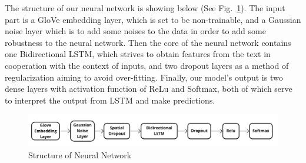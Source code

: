 \documentclass[11pt,a4paper,man,floatsintext]{apa6}
\begin{document}


The structure of our neural network is showing below (See Fig.~\ref{struct}). The input part is a GloVe embedding layer, which is set to be non-trainable, and a Gaussian noise layer which is to add some noises to the data in order to add some robustness to the neural network. Then the core of the neural network contains one Bidirectional LSTM, which strives to obtain features from the text in cooperation with the context of inputs, and two dropout layers as a method of regularization aiming to avoid over-fitting. Finally, our model's output is two dense layers with activation function of ReLu and Softmax, both of which serve to interpret the output from LSTM and make predictions.

\begin{figure}[H]
\centering
\includegraphics[width=6in]{img/NeuralNetworkStructure.jpg}
\caption{Structure of Neural Network
\label{struct}}
\end{figure}
\end{document}
